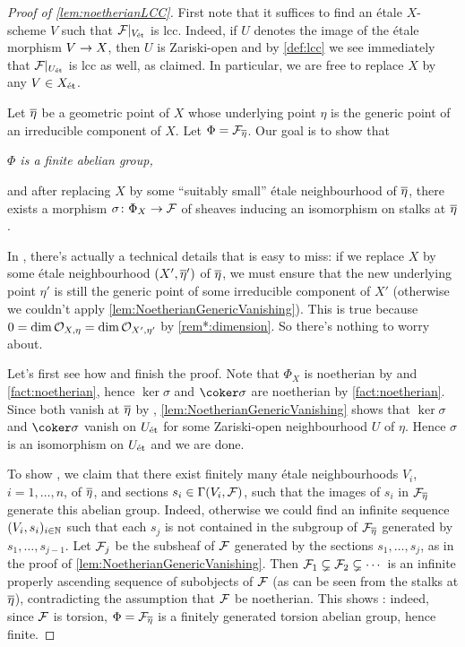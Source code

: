 \begin{proof}[Proof of \cref{lem:noetherianLCC}]
	First note that it suffices to find an étale $X$-scheme $V$ such that $\mathcal{F}|_{V_{\mathrm{\acute{e}t}}}$ is lcc. Indeed, if $U$ denotes the image of the étale morphism $V\morphism X$, then $U$ is Zariski-open and by \cref{def:lcc} we see immediately that $\mathcal{F}|_{U_{\mathrm{\acute{e}t}}}$ is lcc as well, as claimed. In particular, we are free to replace $X$ by any $V\in X_{\mathrm{\acute{e}t}}$.
	
	Let $\ov{\eta}$ be a geometric point of $X$ whose underlying point $\eta$ is the generic point of an irreducible component of $X$. Let $\Phi=\Ff_{\ov{\eta}}$. Our goal is to show that
	\begin{numerate}
		\item \itshape $\Phi$ is a finite abelian group,
		\item and after replacing $X$ by some \enquote{suitably small} étale neighbourhood of $\ov{\eta}$, there exists a morphism $\sigma\colon \Phi_X\morphism \Ff$ of sheaves inducing an isomorphism on stalks at $\ov{\eta}$.
	\end{numerate}
	In , there's actually a technical details that is easy to miss: if we replace $X$ by some étale neighbourhood $(X',\ov{\eta}')$ of $\ov{\eta}$, we must ensure that the new underlying point $\eta'$ is still the generic point of some irreducible component of $X'$ (otherwise we couldn't apply \cref{lem:NoetherianGenericVanishing}). This is true because $0=\dim \mathcal{O}_{X,\eta}=\dim \mathcal{O}_{X',\eta'}$ by \cref{rem*:dimension}. So there's nothing to worry about.
	
	Let's first see how  and  finish the proof. Note that $\Phi_X$ is noetherian by  and \cref{fact:noetherian}, hence $\ker\sigma$ and $\coker\sigma$ are noetherian by \cref{fact:noetherian}. Since both vanish at $\ov{\eta}$ by , \cref{lem:NoetherianGenericVanishing} shows that $\ker\sigma$ and $\coker\sigma$ vanish on $U_{\mathrm{\acute{e}t}}$ for some Zariski-open neighbourhood $U$ of $\eta$. Hence $\sigma$ is an isomorphism on $U_{\mathrm{\acute{e}t}}$ and we are done.
	
	To show , we claim that there exist finitely many étale neighbourhoods $V_i$, $i=1,\dotsc,n$, of $\ov{\eta}$, and sections $s_i\in \operatorname{\Gamma}(V_i,\mathcal{F})$, such that the images of $s_i$ in $\Ff_{\ov{\eta}}$ generate this abelian group. Indeed, otherwise we could find an infinite sequence $(V_i,s_i)_{i\in \mathbb{N}}$ such that each $s_j$ is not contained in the subgroup of $\Ff_{\ov{\eta}}$ generated by $s_1,\dotsc,s_{j-1}$. Let $\mathcal{F}_j$ be the subsheaf of $\mathcal{F}$ generated by the sections $s_1,\dotsc,s_j$, as in the proof of \cref{lem:NoetherianGenericVanishing}. Then $\mathcal{F}_1\subsetneq \mathcal{F}_2\subsetneq \dotsb$ is an infinite properly ascending sequence of subobjects of $\mathcal{F}$ (as can be seen from the stalks at $\ov{\eta}$), contradicting the assumption that $\mathcal{F}$ be noetherian. This shows : indeed, since $\mathcal{F}$ is torsion, $\Phi=\Ff_{\ov{\eta}}$ is a finitely generated torsion abelian group, hence finite.
	

\end{proof}
